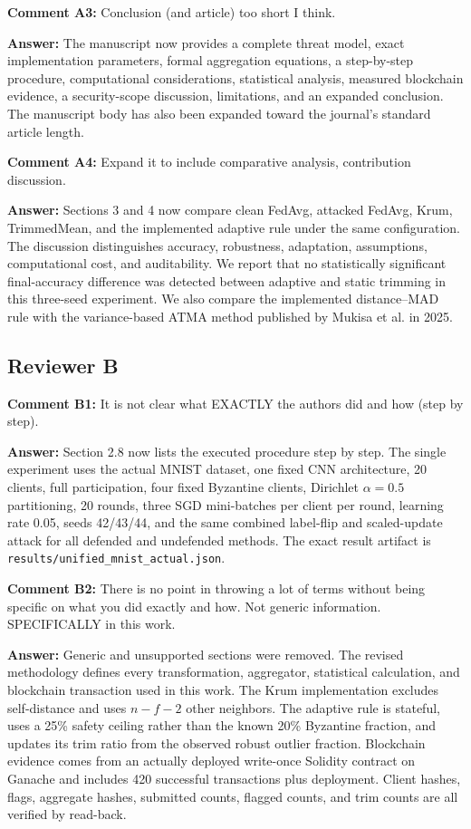 \documentclass[10pt,letterpaper]{article}
\begin{document}
\textbf{Comment A3:} Conclusion (and article) too short I think.

\textbf{Answer:} The manuscript now provides a complete threat model, exact
implementation parameters, formal aggregation equations, a step-by-step
procedure, computational considerations, statistical analysis, measured
blockchain evidence, a security-scope discussion, limitations, and an expanded
conclusion. The manuscript body has also been expanded toward the journal's
standard article length.

\textbf{Comment A4:} Expand it to include comparative analysis, contribution
discussion.

\textbf{Answer:} Sections 3 and 4 now compare clean FedAvg, attacked FedAvg,
Krum, TrimmedMean, and the implemented adaptive rule under the same configuration.
The discussion distinguishes accuracy, robustness, adaptation, assumptions,
computational cost, and auditability. We report that no statistically significant
final-accuracy difference was detected between adaptive and static trimming in
this three-seed experiment. We also compare the implemented distance--MAD rule
with the variance-based ATMA method published by Mukisa et al. in 2025.

\subsection*{Reviewer B}
\textbf{Comment B1:} It is not clear what EXACTLY the authors did and how
(step by step).

\textbf{Answer:} Section 2.8 now lists the executed procedure step by step. The
single experiment uses the actual MNIST dataset, one fixed CNN architecture,
20 clients, full participation, four fixed Byzantine clients, Dirichlet
$\alpha=0.5$ partitioning, 20 rounds, three SGD mini-batches per client per
round, learning rate 0.05, seeds 42/43/44, and the same combined label-flip and
scaled-update attack for all defended and undefended methods. The exact result
artifact is \texttt{results/unified\_mnist\_actual.json}.

\textbf{Comment B2:} There is no point in throwing a lot of terms without being
specific on what you did exactly and how. Not generic information. SPECIFICALLY
in this work.

\textbf{Answer:} Generic and unsupported sections were removed. The revised
methodology defines every transformation, aggregator, statistical calculation,
and blockchain transaction used in this work. The Krum implementation excludes
self-distance and uses $n-f-2$ other neighbors. The adaptive rule is stateful,
uses a 25\% safety ceiling rather than the known 20\% Byzantine fraction, and
updates its trim ratio from the observed robust outlier fraction. Blockchain
evidence comes from an actually deployed write-once Solidity contract on Ganache
and includes 420 successful transactions plus deployment. Client hashes, flags,
aggregate hashes, submitted counts, flagged counts, and trim counts are all
verified by read-back.
\end{document}
